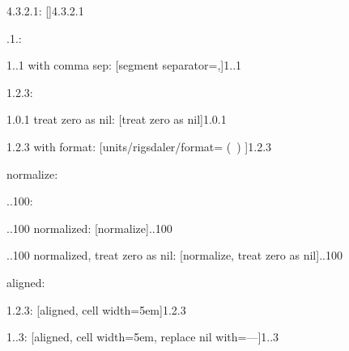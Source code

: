 \documentclass{article}
\begin{document}
4.3.2.1: \hfill {}[]{4.3.2.1}

.1.: \hfill {}

1..1 with comma sep: \hfill {}[segment separator={,}]{1..1}

1.2.3: \hfill {}

1.0.1 treat zero as nil: \hfill {}[treat zero as nil]{1.0.1}

1.2.3 with format: \hfill {}[units/rigsdaler/format={ (\SYMBOL\ \VALUE) }]{1.2.3}

normalize:

..100: \hfill {}

..100 normalized: \hfill {}[normalize]{..100}

..100 normalized, treat zero as nil: \hfill {}[normalize, treat zero as nil]{..100}

aligned:

1.2.3: \hfill {}[aligned, cell width=5em]{1.2.3}

1..3: \hfill {}[aligned, cell width=5em, replace nil with={---}]{1..3}
\end{document}

